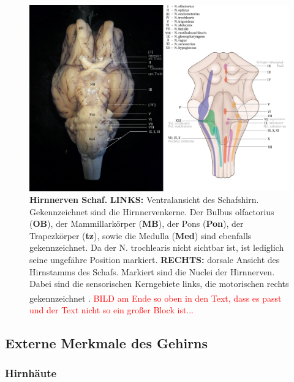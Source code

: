 \documentclass[12pt,a4paper,pdftex]{article}
\begin{document}
\begin{figure}[H]
    \centering
    \includegraphics[width=\textwidth]{pictures/Bilder_Jule/Schaf/Aussenansicht/Hirnnerven.png}
    \caption[Hirnnerven Schaf]{\textbf{Hirnnerven Schaf.} \textbf{LINKS:} Ventralansicht des Schafshirn. Gekennzeichnet sind die Hirnnervenkerne. Der Bulbus olfactorius (\textbf{OB}), der Mammillarkörper (\textbf{MB}), der Pons (\textbf{Pon}), der Trapezkörper (\textbf{tz}), sowie die Medulla (\textbf{Med}) sind ebenfalls gekennzeichnet. Da der N. trochlearis nicht sichtbar ist, ist lediglich seine ungefähre Position markiert. \textbf{RECHTS:} dorsale Ansicht des Hirnstamms des Schafs. Markiert sind die Nuclei der Hirnnerven. Dabei sind die sensorischen Kerngebiete links, die motorischen rechts gekennzeichnet \textsuperscript{\cite[10]{crossman2014neuroanatomy}}. \textcolor{red}{BILD am Ende so oben in den Text, dass es passt und der Text nicht so ein großer Block ist...}}
    \label{fig:hirnnerven_schaf}
\end{figure}{}


\subsection{Externe Merkmale des Gehirns}
\label{subsec:Externe_Merkmale}

\subsubsection{Hirnhäute} 
\end{document}

